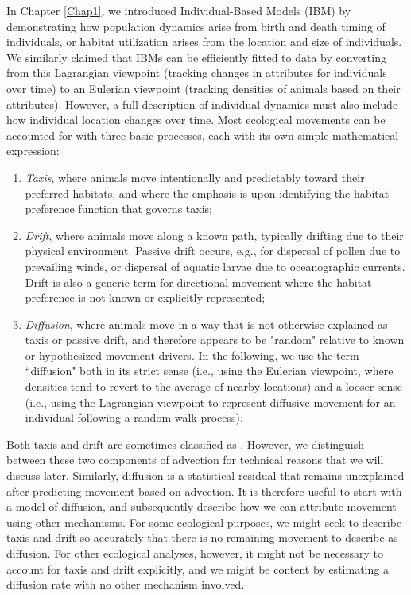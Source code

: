 In Chapter \ref{Chap1}, we introduced Individual-Based Models (IBM) by demonstrating how population dynamics arise from birth and death timing of individuals, or habitat utilization arises from the location and size of individuals.  We similarly claimed that IBMs can be efficiently fitted to data by converting from this Lagrangian viewpoint (tracking changes in attributes for individuals over time) to an Eulerian viewpoint (tracking densities of animals based on their attributes). However, a full description of individual dynamics must also include how individual location changes over time.  Most ecological movements can be accounted for with three basic processes, each with its own simple mathematical expression:
\begin{enumerate}
    \item \textit{Taxis}, where animals move intentionally and predictably toward their preferred habitats, and where the emphasis is upon identifying the habitat preference function that governs taxis;

    \item \textit{{Drift}}, where animals move along a known path, typically drifting due to their physical environment.  Passive drift occurs, e.g., for dispersal of pollen due to prevailing winds, or dispersal of aquatic larvae due to oceanographic currents.  Drift is also a generic term for directional movement where the habitat preference is not known or explicitly represented;
 
    \item \textit{Diffusion}, where animals move in a way that is not otherwise explained as taxis or passive drift, and therefore appears to be "random" relative to known or hypothesized movement drivers.  In the following, we use the term ``diffusion" both in its strict sense (i.e., using the Eulerian viewpoint, where densities tend to revert to the average of nearby locations) and a looser sense (i.e., using the Lagrangian viewpoint to represent diffusive movement for an individual following a random-walk process).
\end{enumerate}
Both taxis and drift are sometimes classified as .  However, we distinguish between these two components of advection for technical reasons that we will discuss later.  Similarly, diffusion is a statistical residual that remains unexplained after predicting movement based on advection.  It is therefore useful to start with a model of diffusion, and subsequently describe how we can attribute movement using other mechanisms.  For some ecological purposes, we might seek to describe taxis and drift so accurately that there is no remaining movement to describe as diffusion.  For other ecological analyses, however, it might not be necessary to account for taxis and drift explicitly, and we might be content by estimating a diffusion rate with no other mechanism involved. 

